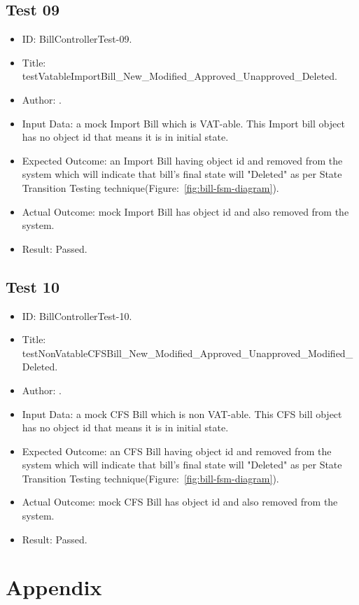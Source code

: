 \documentclass[12pt]{article}
\makeatletter
\let\theauthor\@author
\makeatother
\begin{document}
\subsection{Test 09}
\begin{itemize}
	
    \item ID: BillControllerTest-09.
    
    \item Title: testVatableImportBill\_New\_Modified\_Approved\_Unapproved\_Deleted.
    
    \item Author: \theauthor.
    
    \item Input Data: a mock Import Bill which is VAT-able. This Import bill object has no object id that means it is in initial state.
    
    \item Expected Outcome: an Import Bill having object id and removed from the system which will indicate that bill's final state will "Deleted" as per State Transition Testing technique(Figure:~\ref{fig:bill-fsm-diagram}).
    
    \item Actual Outcome: mock Import Bill has object id and also removed from the system.
    
    \item Result: Passed.

\end{itemize}

\subsection{Test 10}
\begin{itemize}
	
    \item ID: BillControllerTest-10.
    
    \item Title: testNonVatableCFSBill\_New\_Modified\_Approved\_Unapproved\_Modified\_Deleted.
    
    \item Author: \theauthor.
    
    \item Input Data: a mock CFS Bill which is non VAT-able. This CFS bill object has no object id that means it is in initial state.
    
    \item Expected Outcome: an CFS Bill having object id and removed from the system which will indicate that bill's final state will "Deleted" as per State Transition Testing technique(Figure:~\ref{fig:bill-fsm-diagram}).
    
    \item Actual Outcome: mock CFS Bill has object id and also removed from the system.
    
    \item Result: Passed.

\end{itemize}

\newpage

\appendix
\section{Appendix}
\listoffigures
\listoftables

\newpage



\end{document}
